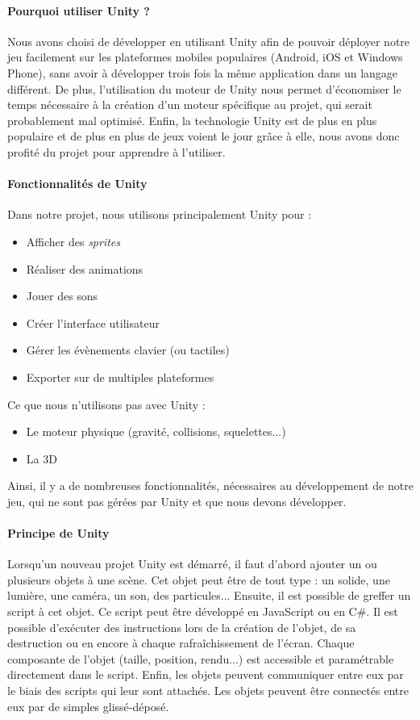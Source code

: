 \paragraph{Pourquoi utiliser Unity ?}

Nous avons choisi de développer en utilisant Unity afin de pouvoir déployer notre jeu facilement sur les plateformes mobiles populaires (Android, iOS et Windows Phone), sans avoir à développer trois fois la même application dans un langage différent. De plus, l'utilisation du moteur de Unity nous permet d'économiser le temps nécessaire à la création d'un moteur spécifique au projet, qui serait probablement mal optimisé. Enfin, la technologie Unity est de plus en plus populaire et de plus en plus de jeux voient le jour grâce à elle, nous avons donc profité du projet pour apprendre à l'utiliser.
 
\paragraph{Fonctionnalités de Unity}
Dans notre projet, nous utilisons principalement Unity pour :
\begin{itemize}
\item Afficher des \textit{sprites}
\item Réaliser des animations
\item Jouer des sons
\item Créer l'interface utilisateur
\item Gérer les évènements clavier (ou tactiles)
\item Exporter sur de  multiples plateformes
\end{itemize}
Ce que nous n'utilisons pas avec Unity :
\begin{itemize}
\item Le moteur physique (gravité, collisions, squelettes...)
\item La 3D
\end{itemize}
Ainsi, il y a de nombreuses fonctionnalités, nécessaires au développement de notre jeu, qui ne sont pas gérées par Unity et que nous devons développer.
 
\paragraph{Principe de Unity}
Lorsqu'un nouveau projet Unity est démarré, il faut d'abord ajouter un ou plusieurs objets à une scène. Cet objet peut être de tout type : un solide, une lumière, une caméra, un son, des particules... Ensuite, il est possible de greffer un script à cet objet. Ce script peut être développé en JavaScript ou en C\#. Il est possible d'exécuter des instructions lors de la création de l'objet, de sa destruction ou en encore à chaque rafraîchissement de l'écran. Chaque composante de l'objet (taille, position, rendu...) est accessible et paramétrable directement dans le script. Enfin, les objets peuvent communiquer entre eux par le biais des scripts qui leur sont attachés. Les objets peuvent être connectés entre eux par de simples glissé-déposé.

